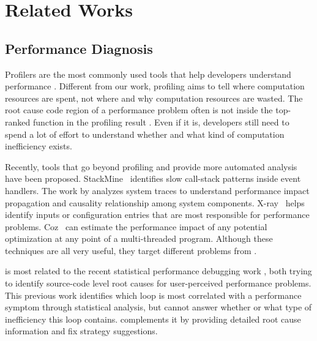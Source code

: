 \section{Related Works}
\label{sec:related}

\subsection{Performance Diagnosis}
Profilers are the most commonly used tools that help developers understand
performance
\cite{Zaparanuks:2012:AP:2254064.2254074,Coppa:2012:IP:2254064.2254076,
D'Elia:2011:MHC:1993498.1993559, 
Mytkowicz:2010:EAJ:1806596.1806618,
Ravindranath:2012:AMA:2387880.2387891,
Jovic:2011:CMY:2048066.2048081,IntroPerf}.
Different from our work, profiling aims to tell where 
computation resources are spent, 
not where and why computation resources are wasted. 
The root cause code region of a performance problem often is not inside
the top-ranked function in the profiling result \cite{SongOOPSLA2014}.
Even if it is, developers still need to spend a lot of effort to understand
whether and what kind of computation inefficiency exists.

Recently, tools that go beyond profiling and provide more automated analysis
have been proposed.
StackMine~\cite{Han:2012:PDL:2337223.2337241} 
identifies slow call-stack patterns inside event handlers. The work by
\citet{TaoAsplos2014} analyzes system traces to understand 
performance impact propagation and 
causality relationship among system components. 
X-ray~\cite{Attariyan:2012:XAR:2387880.2387910} helps identify inputs
or configuration entries that are most responsible for performance problems.
Coz~\cite{coz.sosp15} can estimate the performance impact of any
potential optimization at any point of a multi-threaded program.
Although these techniques are all very useful, 
they target different problems from \Tool. 

\Tool is most related to
the recent statistical performance debugging work
\citep{SongOOPSLA2014}, both trying to identify source-code level root causes
for user-perceived performance problems. 
This previous work identifies which loop is most correlated with 
a performance symptom through statistical analysis, 
but cannot answer whether or 
what type of inefficiency this loop contains.
\Tool complements it by
providing detailed root cause information and fix strategy suggestions.

